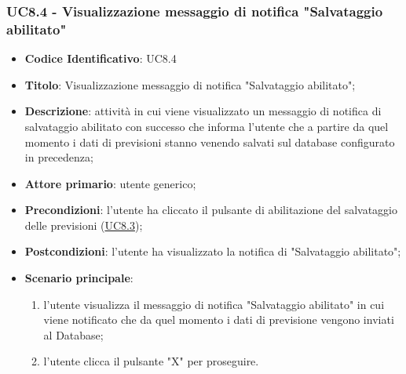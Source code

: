 	\subsubsection{UC8.4 - Visualizzazione messaggio di notifica "Salvataggio abilitato"}	
	\begin{itemize}
			\item\textbf{Codice Identificativo}: UC8.4
			\item\textbf{Titolo}: Visualizzazione messaggio di notifica "Salvataggio abilitato";
			\item\textbf{Descrizione}: attività in cui viene visualizzato un messaggio di notifica di salvataggio abilitato con successo che informa l'utente che a partire da quel momento i dati di previsioni stanno venendo salvati sul database configurato in precedenza;
			\item\textbf{Attore primario}: utente generico;
			\item\textbf{Precondizioni}: l'utente ha cliccato il pulsante di abilitazione del salvataggio delle previsioni (\hyperref[par:UC8.3]{UC8.3});
			\item\textbf{Postcondizioni}: l'utente ha visualizzato la notifica di "Salvataggio abilitato";
			\item\textbf{Scenario principale}:
				\begin{enumerate}
					\item l'utente visualizza il messaggio di notifica "Salvataggio abilitato" in cui viene notificato che da quel momento i dati di previsione vengono inviati al Database;
					\item l'utente clicca il pulsante "X" per proseguire.		
				\end{enumerate}		
		\end{itemize}
		
		\label{par:UC8.5}
